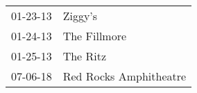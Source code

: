 \begin{supertabular}{p{0.25\columnwidth}p{0.75\columnwidth}}
 01-23-13 &                 Ziggy's \\
 01-24-13 &            The Fillmore \\
 01-25-13 &                The Ritz \\
 07-06-18 &  Red Rocks Amphitheatre \\
\end{supertabular}
